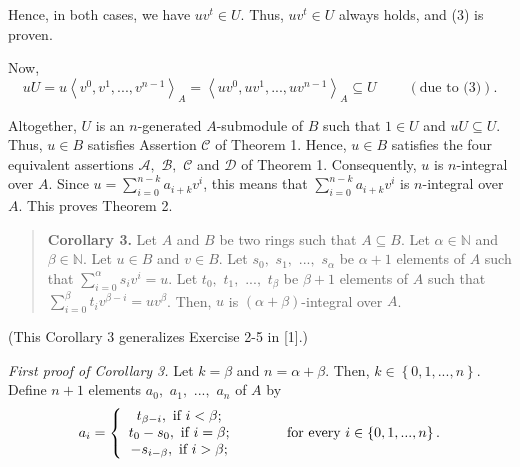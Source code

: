 \documentclass[12pt,final,notitlepage,onecolumn]{article}%
\begin{document}
Hence, in both cases, we have $uv^{t}\in U$. Thus, $uv^{t}\in U$ always holds,
and (3) is proven.

Now,%
\[
uU=u\left\langle v^{0},v^{1},...,v^{n-1}\right\rangle _{A}=\left\langle
uv^{0},uv^{1},...,uv^{n-1}\right\rangle _{A}\subseteq
U\ \ \ \ \ \ \ \ \ \ \left(  \text{due to (3)}\right)  .
\]


Altogether, $U$ is an $n$-generated $A$-submodule of $B$ such that $1\in U$
and $uU\subseteq U$. Thus, $u\in B$ satisfies Assertion $\mathcal{C}$ of
Theorem 1. Hence, $u\in B$ satisfies the four equivalent assertions
$\mathcal{A},$ $\mathcal{B},$ $\mathcal{C}$ and $\mathcal{D}$ of Theorem 1.
Consequently, $u$ is $n$-integral over $A$. Since $u=\sum\limits_{i=0}%
^{n-k}a_{i+k}v^{i}$, this means that $\sum\limits_{i=0}^{n-k}a_{i+k}v^{i}$ is
$n$-integral over $A$. This proves Theorem 2.

\begin{quote}
\textbf{Corollary 3.} Let $A$ and $B$ be two rings such that $A\subseteq B$.
Let $\alpha\in\mathbb{N}$ and $\beta\in\mathbb{N}$. Let $u\in B$ and $v\in B$.
Let $s_{0},$ $s_{1},$ $...,$ $s_{\alpha}$ be $\alpha+1$ elements of $A$ such
that $\sum\limits_{i=0}^{\alpha}s_{i}v^{i}=u$. Let $t_{0},$ $t_{1},$ $...,$
$t_{\beta}$ be $\beta+1$ elements of $A$ such that $\sum\limits_{i=0}^{\beta
}t_{i}v^{\beta-i}=uv^{\beta}$. Then, $u$ is $\left(  \alpha+\beta\right)
$-integral over $A$.
\end{quote}

(This Corollary 3 generalizes Exercise 2-5 in [1].)

\textit{First proof of Corollary 3.} Let $k=\beta$ and $n=\alpha+\beta$. Then,
$k\in\left\{  0,1,...,n\right\}  $. Define $n+1$ elements $a_{0},$ $a_{1},$
$...,$ $a_{n}$ of $A$ by%
\[
a_{i}=\left\{
\begin{array}
[c]{c}%
t_{\beta-i},\text{ if }i<\beta;\\
t_{0}-s_{0},\text{ if }i=\beta;\\
-s_{i-\beta},\text{ if }i>\beta;
\end{array}
\right.  \ \ \ \ \ \ \ \ \ \ \text{for every }i\in\left\{  0,1,...,n\right\}
.
\]
\end{document}
